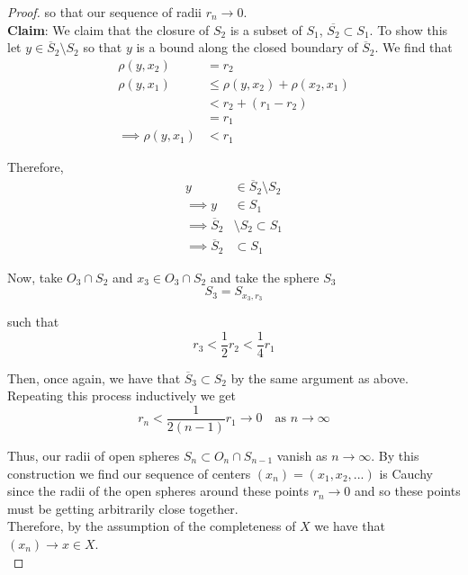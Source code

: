 \documentclass[12pt]{article}
\newlength\tindent
\renewcommand{\indent}{\hspace*{\tindent}}
\begin{document}
\begin{proof}
so that our sequence of radii $r_n \to 0$. \\

{\bf Claim}: We claim that the closure of $S_2$ is a subset of $S_1$, $\overline{S_2} \subset S_1$. To show this let $y \in \overline{S}_2 \setminus S_2$ so that $y$ is a bound along the closed boundary of $\overline{S}_2$. We find that
\begin{align*}
	\rho(y,x_2) &= r_2 \\
	\rho(y,x_1) &\leq \rho(y, x_2) + \rho(x_2, x_1) \\
	&< r_2 + (r_1 - r_2) \\
	&= r_1 \\
	\implies \rho(y,x_1) &< r_1
\end{align*}

Therefore,
\begin{align*}
	y &\in \overline{S}_2 \setminus S_2 \\
	\implies y &\in S_1 \\
	\implies \overline{S}_2&\setminus S_2 \subset S_1 \\
	\implies \overline{S}_2 &\subset S_1
\end{align*}

Now, take $O_3 \cap S_2$ and $x_3 \in O_3 \cap S_2$ and take the sphere $S_3$
\begin{equation*}
	S_3 = S_{x_3, r_3}
\end{equation*}

such that
\begin{equation*}
	r_3 < \frac{1}{2} r_2 < \frac{1}{4} r_1
\end{equation*}

Then, once again, we have that $\overline{S}_3 \subset S_2$ by the same argument as above. \\

Repeating this process inductively we get 
\begin{equation*}
	r_n < \frac{1}{2(n - 1)} r_1 \longrightarrow 0 \quad \text{as } n\longrightarrow\infty	
\end{equation*}

\indent Thus, our radii of open spheres $S_n \subset O_n\cap S_{n - 1}$ vanish as $n\to\infty$. By this construction we find our sequence of centers $(x_n) = (x_1, x_2, ...)$ is Cauchy since the radii of the open spheres around these points $r_n\to 0$ and so these points must be getting arbitrarily close together. \\

Therefore, by the assumption of the completeness of $X$ we have that $(x_n)\longrightarrow x\in X$. \\


\end{proof}
\end{document}
